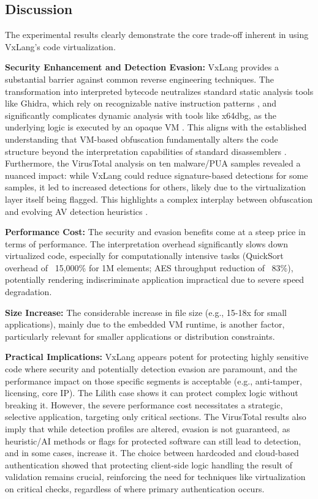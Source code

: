\subsection{Discussion}
The experimental results clearly demonstrate the core trade-off inherent in using VxLang's code virtualization.

\textbf{Security Enhancement and Detection Evasion:} VxLang provides a substantial barrier against common reverse engineering techniques. The transformation into interpreted bytecode neutralizes standard static analysis tools like Ghidra, which rely on recognizable native instruction patterns \cite{Eilam2011, Ko2007}, and significantly complicates dynamic analysis with tools like x64dbg, as the underlying logic is executed by an opaque VM \cite{Sikorski2012}. This aligns with the established understanding that VM-based obfuscation fundamentally alters the code structure beyond the interpretation capabilities of standard disassemblers \cite{Ore06, Salwan2018SymbolicDeobfuscation}. Furthermore, the VirusTotal analysis on ten malware/PUA samples revealed a nuanced impact: while VxLang could reduce signature-based detections for some samples, it led to increased detections for others, likely due to the virtualization layer itself being flagged. This highlights a complex interplay between obfuscation and evolving AV detection heuristics \cite{Ore06, Salwan2018SymbolicDeobfuscation, Rou13}.

\textbf{Performance Cost:} The security and evasion benefits come at a steep price in terms of performance. The interpretation overhead significantly slows down virtualized code, especially for computationally intensive tasks (QuickSort overhead of ~15,000\% for 1M elements; AES throughput reduction of ~83\%), potentially rendering indiscriminate application impractical due to severe speed degradation.

\textbf{Size Increase:} The considerable increase in file size (e.g., 15-18x for small applications), mainly due to the embedded VM runtime, is another factor, particularly relevant for smaller applications or distribution constraints.

\textbf{Practical Implications:} VxLang appears potent for protecting highly sensitive code where security and potentially detection evasion are paramount, and the performance impact on those specific segments is acceptable (e.g., anti-tamper, licensing, core IP). The Lilith case shows it can protect complex logic without breaking it. However, the severe performance cost necessitates a strategic, selective application, targeting only critical sections. The VirusTotal results also imply that while detection profiles are altered, evasion is not guaranteed, as heuristic/AI methods or flags for protected software can still lead to detection, and in some cases, increase it. The choice between hardcoded and cloud-based authentication showed that protecting client-side logic handling the result of validation remains crucial, reinforcing the need for techniques like virtualization on critical checks, regardless of where primary authentication occurs.
